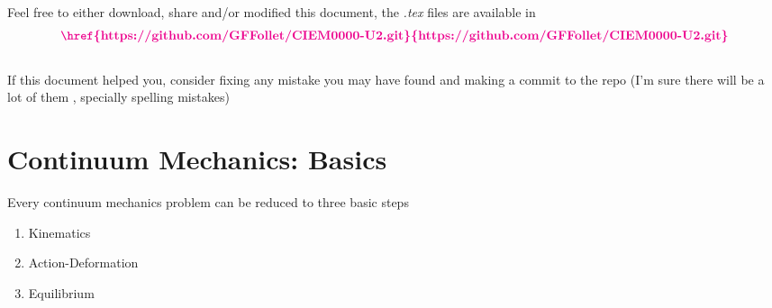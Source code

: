 \documentclass[a4paper, 11pt,article,oneside]{memoir}%
\begin{document}
Feel free to either download, share and/or modified this document, the \textit{.tex} files are available  in\\ \begin{gather*} \textbf{{\color{magenta}\href{https://github.com/GFFollet/CIEM0000-U2.git}{https://github.com/GFFollet/CIEM0000-U2.git}}}
\end{gather*}\\
If this document helped you, consider fixing any mistake you may have found and making a commit to the repo (I'm sure there will be a lot of them , specially spelling mistakes)
\newpage
\tableofcontents
\newpage



\chapter{Continuum Mechanics: Basics}
Every continuum mechanics problem can be reduced to three basic steps

\begin{enumerate}
\item Kinematics
\item Action-Deformation
\item Equilibrium
\end{enumerate}
	
\end{document}
